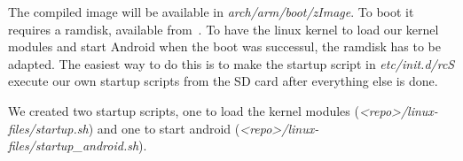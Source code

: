 The compiled image will be available in \emph{arch/arm/boot/zImage}.
To boot it requires a ramdisk, available from~\cite{DigilentReferenceDesign}.
To have the linux kernel to load our kernel modules and start Android when the
boot was successul, the ramdisk has to be adapted.
The easiest way to do this is to make the startup script in
\emph{etc/init.d/rcS} execute our own startup scripts from the SD card after
everything else is done.

We created two startup scripts, one to load the kernel modules
(\emph{<repo>/linux-files/startup.sh}) and one to start android
(\emph{<repo>/linux-files/startup\_android.sh}).
